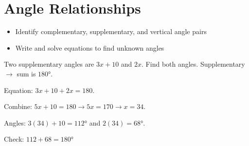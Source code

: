 \section{Angle Relationships}

\begin{stepGoal}
\begin{itemize}
    \item Identify complementary, supplementary, and vertical angle pairs
    \item Write and solve equations to find unknown angles
\end{itemize}
\end{stepGoal}

\begin{stepVocabBox}
\end{stepVocabBox}

\begin{stepsCard}
\end{stepsCard}

\begin{stepExample}{Two supplementary angles are $3x + 10$ and $2x$. Find both angles.}
     Supplementary $\to$ sum is $180°$.

     Equation: $3x + 10 + 2x = 180$.

     Combine: $5x + 10 = 180 \to 5x = 170 \to x = 34$.\par
    Angles: $3(34) + 10 = 112°$ and $2(34) = 68°$.

     Check: $112 + 68 = 180°$ \checkmark
\end{stepExample}

